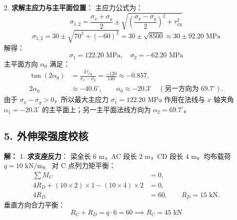 \documentclass[11pt,a4paper]{ctexrep}
\begin{document}
{2. \textbf{求解主应力与主平面位置}：
主应力公式为：
\[
\sigma_{1,2} = \frac{\sigma_x + \sigma_y}{2} \pm \sqrt{\left(\frac{\sigma_x - \sigma_y}{2}\right)^2 + \tau_{xy}^2}
\]
\[
\sigma_{1,2} = 30 \pm \sqrt{70^2 + (-60)^2} = 30 \pm \sqrt{8500} \approx 30 \pm 92.20\text{ MPa}
\]
解得：
\[
\sigma_1 = 122.20\text{ MPa}, \quad \sigma_2 = -62.20\text{ MPa}
\]
主平面方向 $\alpha_0$ 满足：
\[
\begin{aligned}
\tan(2\alpha_0)
&= \frac{2\tau_{xy}}{\sigma_x - \sigma_y}
= \frac{-120}{140}\approx -0.857,\\
2\alpha_0&\approx -40.6^\circ,\qquad
\alpha_0\approx -20.3^\circ
\quad(\text{另一方向为 }69.7^\circ).
\end{aligned}
\]
由于 $\sigma_x - \sigma_y > 0$，所以最大主应力 $\sigma_1 = 122.20\text{ MPa}$ 作用在法线与 $x$ 轴夹角 $\alpha_1=-20.3^\circ$ 的主平面上；另一主平面法线方向为 $\alpha_2=69.7^\circ$。
\begin{center}
\end{center}

\subsection*{5. 外伸梁强度校核}
\textbf{解：}
1. \textbf{求支座反力}：
梁全长 $6\text{ m}$，AC 段长 $2\text{ m}$，CD 段长 $4\text{ m}$。均布载荷 $q = 10\text{ kN/m}$。
对 C 点列力矩平衡：
\[
\begin{aligned}
\sum M_C &=0,\\
4R_D+(10\times2)\times1-(10\times4)\times2&=0,\\
4R_D&=60,\qquad R_D=15\text{ kN}.
\end{aligned}
\]
垂直方向合力平衡：
\[
R_C + R_D = q \cdot 6 = 60 \implies R_C = 45\text{ kN}
\]

}
\end{document}
